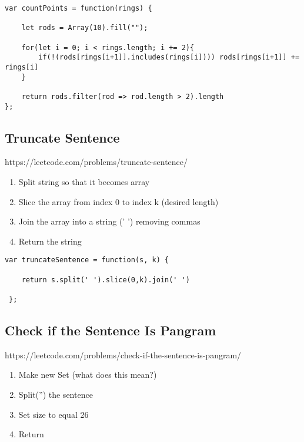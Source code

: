 \documentclass[10pt]{article}
\begin{document}
\begin{lstlisting}[title=Solution countPoints is this slower?, captionpos=t]
var countPoints = function(rings) {

    let rods = Array(10).fill("");

    for(let i = 0; i < rings.length; i += 2){
        if(!(rods[rings[i+1]].includes(rings[i]))) rods[rings[i+1]] += rings[i]
    }
    
    return rods.filter(rod => rod.length > 2).length
};
\end{lstlisting}
\medskip %



\pagebreak %
\medskip 
\subsection{Truncate Sentence}
https://leetcode.com/problems/truncate-sentence/

\begin{enumerate}
	\item Split string so that it becomes array
	\item Slice the array from index 0 to index k (desired length)
	\item Join the array into a string (' ') removing commas
	\item Return the string
\end{enumerate}

\begin{lstlisting}[title=Solution truncateSentence, captionpos=t]
var truncateSentence = function(s, k) {

    return s.split(' ').slice(0,k).join(' ')
    
 };
\end{lstlisting}
\medskip %




\pagebreak %
\medskip 
\subsection{Check if the Sentence Is Pangram}
https://leetcode.com/problems/check-if-the-sentence-is-pangram/

\begin{enumerate}
	\item Make new Set (what does this mean?)
	\item Split('') the sentence
	\item Set size to equal 26
	\item Return
\end{enumerate}
\end{document}
